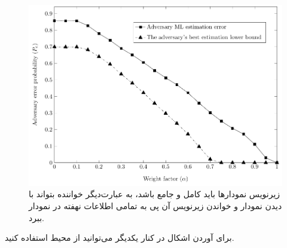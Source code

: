\documentclass{CSICC2016}
\begin{document}
\begin{figure}
\includegraphics[width=.9\linewidth]{Images/sumXYPlot}
\caption{
زیرنویس نمودارها باید کامل و جامع باشد، به عبارت‌دیگر خواننده بتواند با دیدن نمودار و خواندن زیرنویس آن پی به تمامی اطلاعات نهفته در نمودار ببرد.}
\label{fig:sumXYPlot}
\end{figure}
برای آوردن اشکال در کنار یکدیگر می‌توانید از محیط  استفاده کنید. 
\end{document}
